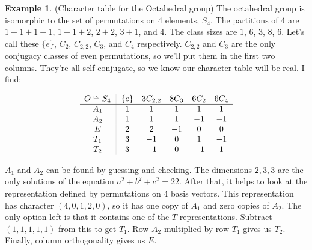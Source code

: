 \documentclass[12pt, letterpaper]{article}
\theoremstyle{definition} %
\newtheorem{ex}[thm]{Example}
\begin{document}
\begin{ex}
  (Character table for the Octahedral  group)
  The octahedral group is isomorphic to the set of permutations on 4 elements, $S_4$. 
  The partitions of 4 are $1+1+1+1$, $1+1+2$, $2+2$, $3+1$, and $4$. 
  The class sizes are $1$, $6$, $3$, $8$, $6$. Let's call these 
  $\{e\}$, $C_2$, $C_{2,2}$, $C_3$, and $C_4$ respectively. $C_{2,2}$ and $C_3$ are the only conjugacy classes of even permutations, so we'll put them in the first
  two columns. They're all self-conjugate, so we know our character table will be real.
  I find:

\begin{equation*}
 \begin{array}{c || c c c c c} 
   O \cong S_4& \{e\} & 3C_{2,2} & 8C_3 & 6C_2 & 6C_4   \\ 
 \hline
 A_1 & 1 & 1 & 1 & 1 & 1 \\ 
 A_2 & 1 & 1 & 1 & -1 & -1 \\ 
 E & 2 & 2 & -1 & 0 & 0  \\ 
 T_1 & 3 & -1 & 0 & 1 & -1  \\ 
 T_2 & 3 & -1 & 0 & -1 & 1 
\end{array}
\end{equation*}

$A_1$ and $A_2$ can be found by guessing and checking. The dimensions $2,3,3$ are the only solutions of the equation $a^2+b^2+c^2=22$. 
After that, it helps to look at the representation defined by permutations on 4 basis vectors. This representation has character $(4,0,1,2,0)$,
so it has one copy of $A_1$ and zero copies of $A_2$. The only option left is that it contains one of the $T$ representations. Subtract 
$(1,1,1,1,1)$ from this to get $T_1$. Row $A_2$ multiplied by row $T_1$ gives us $T_2$. Finally, column orthogonality gives us $E$.
\end{ex}
\end{document}
